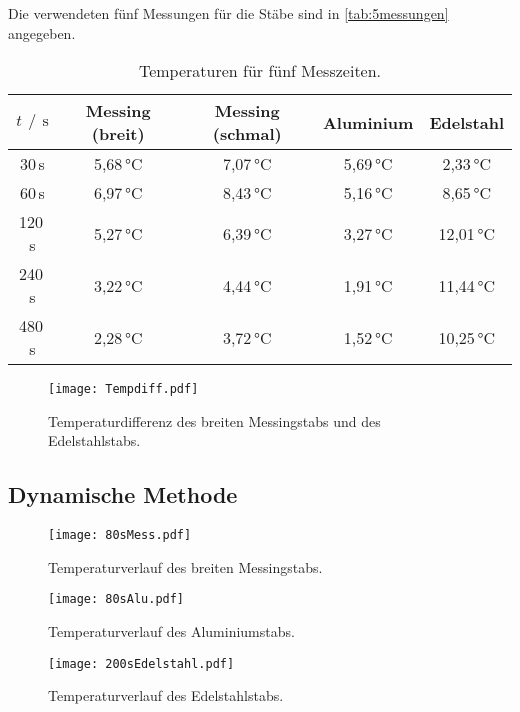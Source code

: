 Die verwendeten fünf Messungen für die Stäbe sind in \autoref{tab:5messungen} angegeben.
\begin{table}[h]
  \centering
  \caption{Temperaturen für fünf Messzeiten.}
  \label{tab:5messungen}
  \begin{tabular}{c c c c c}
    \toprule
    $t\,\mathbin{/}\,\si{\second}$ & Messing (breit) & Messing (schmal) & Aluminium & Edelstahl \\
    \midrule
     30\,\si{\second} & 5,68\,\si{\celsius} & 7,07\,\si{\celsius} & 5,69\,\si{\celsius} & 2,33\,\si{\celsius} \\
     60\,\si{\second} & 6,97\,\si{\celsius} & 8,43\,\si{\celsius} & 5,16\,\si{\celsius} & 8,65\,\si{\celsius} \\
    120\,\si{\second} & 5,27\,\si{\celsius} & 6,39\,\si{\celsius} & 3,27\,\si{\celsius} & 12,01\,\si{\celsius} \\
    240\,\si{\second} & 3,22\,\si{\celsius} & 4,44\,\si{\celsius} & 1,91\,\si{\celsius} & 11,44\,\si{\celsius} \\
    480\,\si{\second} & 2,28\,\si{\celsius} & 3,72\,\si{\celsius} & 1,52\,\si{\celsius} & 10,25\,\si{\celsius} \\
    \bottomrule
  \end{tabular}
\end{table}


\begin{figure}[h]
  \centering
  \texttt{[image: Tempdiff.pdf]}
  \caption{Temperaturdifferenz des breiten Messingstabs und des Edelstahlstabs.}
  \label{fig:Tempdiff}
\end{figure}

\subsection{Dynamische Methode}
\label{dynam}

\begin{figure}[h]
  \centering
  \texttt{[image: 80sMess.pdf]}
  \caption{Temperaturverlauf des breiten Messingstabs.}
  \label{fig:80sMess}
\end{figure}

\begin{figure}[h]
  \centering
  \texttt{[image: 80sAlu.pdf]}
  \caption{Temperaturverlauf des Aluminiumstabs.}
  \label{fig:80sAlu}
\end{figure}

\begin{figure}[h]
  \centering
  \texttt{[image: 200sEdelstahl.pdf]}
  \caption{Temperaturverlauf des Edelstahlstabs.}
  \label{fig:200sEdelstahl}
\end{figure}
